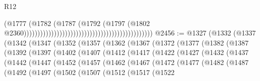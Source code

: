 \begin{lexlean}{R12}
\begin{coremodule}
                                                                                      (@1777
                                                                                        (@1782
                                                                                          (@1787
                                                                                            (@1792
                                                                                              (@1797
                                                                                                (@1802
                                                                                                  @2360)))))))))))))))))))))))))))))))))))))))))))))))
@2456 := @1327
    (@1332
      (@1337
        (@1342
          (@1347
            (@1352
              (@1357
                (@1362
                  (@1367
                    (@1372
                      (@1377
                        (@1382
                          (@1387
                            (@1392
                              (@1397
                                (@1402
                                  (@1407
                                    (@1412
                                      (@1417
                                        (@1422
                                          (@1427
                                            (@1432
                                              (@1437
                                                (@1442
                                                  (@1447
                                                    (@1452
                                                      (@1457
                                                        (@1462
                                                          (@1467
                                                            (@1472
                                                              (@1477
                                                                (@1482
                                                                  (@1487
                                                                    (@1492
                                                                      (@1497
                                                                        (@1502
                                                                          (@1507
                                                                            (@1512
                                                                              (@1517
                                                                                (@1522

\end{coremodule}
\end{lexlean}
